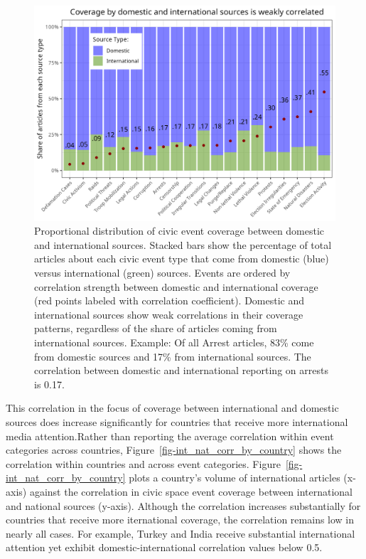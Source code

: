 \documentclass[
  letterpaper,
  DIV=11,
  numbers=noendperiod]{scrartcl}
\begin{document}
\begin{figure}

{\centering \includegraphics{source_comparison/figures/int_share_norm.png}

}

\caption{\label{fig-int_share_norm}Proportional distribution of civic
event coverage between domestic and international sources. Stacked bars
show the percentage of total articles about each civic event type that
come from domestic (blue) versus international (green) sources. Events
are ordered by correlation strength between domestic and international
coverage (red points labeled with correlation coefficient). Domestic and
international sources show weak correlations in their coverage patterns,
regardless of the share of articles coming from international sources.
Example: Of all Arrest articles, 83\% come from domestic sources and
17\% from international sources. The correlation between domestic and
international reporting on arrests is 0.17.}

\end{figure}

This correlation in the focus of coverage between international and
domestic sources does increase significantly for countries that receive
more international media attention.Rather than reporting the average
correlation within event categories across countries,
Figure~\ref{fig-int_nat_corr_by_country} shows the correlation within
countries and across event categories.
Figure~\ref{fig-int_nat_corr_by_country} plots a country's volume of
international articles (x-axis) against the correlation in civic space
event coverage between international and national sources (y-axis).
Although the correlation increases substantially for countries that
receive more iternational coverage, the correlation remains low in
nearly all cases. For example, Turkey and India receive substantial
international attention yet exhibit domestic-international correlation
values below 0.5.
\end{document}
